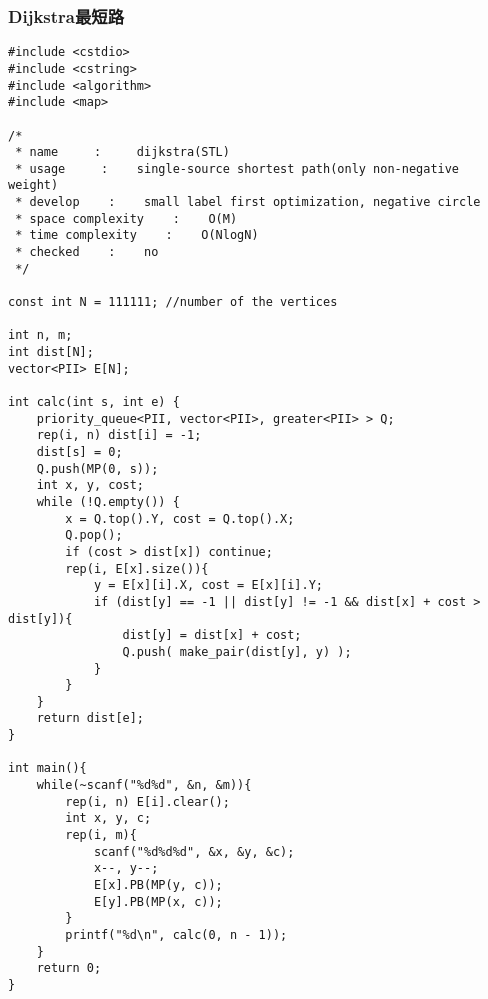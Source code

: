 \subsubsection{Dijkstra最短路}
\begin{verbatim}
#include <cstdio>
#include <cstring>
#include <algorithm>
#include <map>

/*
 * name     :     dijkstra(STL)
 * usage     :    single-source shortest path(only non-negative weight)
 * develop    :    small label first optimization, negative circle
 * space complexity    :    O(M)
 * time complexity    :    O(NlogN)
 * checked    :    no
 */

const int N = 111111; //number of the vertices

int n, m;
int dist[N];
vector<PII> E[N];

int calc(int s, int e) {
    priority_queue<PII, vector<PII>, greater<PII> > Q;
    rep(i, n) dist[i] = -1;
    dist[s] = 0;
    Q.push(MP(0, s));
    int x, y, cost;
    while (!Q.empty()) {
        x = Q.top().Y, cost = Q.top().X;
        Q.pop();
        if (cost > dist[x]) continue;
        rep(i, E[x].size()){
            y = E[x][i].X, cost = E[x][i].Y;
            if (dist[y] == -1 || dist[y] != -1 && dist[x] + cost > dist[y]){
                dist[y] = dist[x] + cost;
                Q.push( make_pair(dist[y], y) );
            }
        }
    }
    return dist[e];
}

int main(){
    while(~scanf("%d%d", &n, &m)){
        rep(i, n) E[i].clear();
        int x, y, c;
        rep(i, m){
            scanf("%d%d%d", &x, &y, &c);
            x--, y--;
            E[x].PB(MP(y, c));
            E[y].PB(MP(x, c));
        }
        printf("%d\n", calc(0, n - 1));
    }
    return 0;
}
\end{verbatim}
